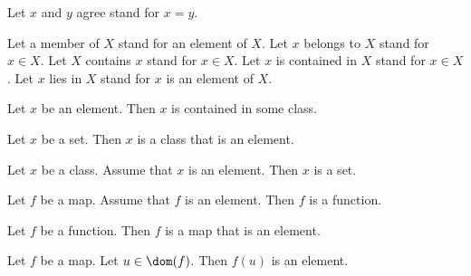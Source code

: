 \begin{forthel}

  Let $x$ and $y$ agree stand for $x = y$.

  Let a member of $X$ stand for an element of $X$.
  Let $x$ belongs to $X$ stand for $x \in X$.
  Let $X$ contains $x$ stand for $x \in X$.
  Let $x$ is contained in $X$ stand for $x \in X$.
  Let $x$ lies in $X$ stand for $x$ is an element of $X$.

  \begin{axiom}
    Let $x$ be an element.
    Then $x$ is contained in some class.
  \end{axiom}

  \begin{lemma}
    Let $x$ be a set.
    Then $x$ is a class that is an element.
  \end{lemma}

  \begin{lemma}
    Let $x$ be a class.
    Assume that $x$ is an element.
    Then $x$ is a set.
  \end{lemma}

  \begin{lemma}
    Let $f$ be a map.
    Assume that $f$ is an element.
    Then $f$ is a function.
  \end{lemma}

  \begin{lemma}
    Let $f$ be a function.
    Then $f$ is a map that is an element.
  \end{lemma}

  \begin{lemma}
    Let $f$ be a map.
    Let $u \in \dom(f)$.
    Then $f(u)$ is an element.
  \end{lemma}
\end{forthel}
